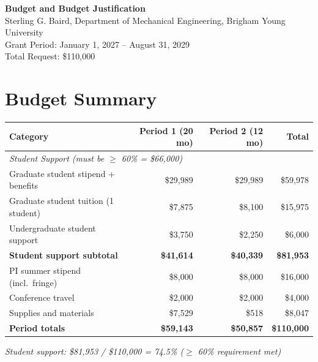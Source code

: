 \documentclass[12pt]{article}
\begin{document}
\begin{center}
{\Large \textbf{Budget and Budget Justification}}\\[0.5em]
{\normalsize Sterling G. Baird, Department of Mechanical Engineering, Brigham Young University}\\[0.3em]
{\normalsize Grant Period: January 1, 2027 -- August 31, 2029}\\[0.3em]
{\normalsize Total Request: \$110,000}
\end{center}

\bigskip

\section*{Budget Summary}

\begin{center}
\begin{tabular}{l r r r}
\toprule
\textbf{Category} & \textbf{Period 1 (20 mo)} & \textbf{Period 2 (12 mo)} & \textbf{Total} \\
\midrule
\multicolumn{4}{l}{\textit{Student Support (must be $\geq$ 60\% = \$66,000)}} \\
\quad Graduate student stipend + benefits & \$29,989 & \$29,989 & \$59,978 \\
\quad Graduate student tuition (1 student) & \$7,875  & \$8,100  & \$15,975 \\
\quad Undergraduate student support       & \$3,750  & \$2,250  & \$6,000 \\
\textbf{Student support subtotal}         & \textbf{\$41,614} & \textbf{\$40,339} & \textbf{\$81,953} \\
\midrule
PI summer stipend (incl.\ fringe)         & \$8,000  & \$8,000  & \$16,000 \\
Conference travel                         & \$2,000  & \$2,000  & \$4,000 \\
Supplies and materials                    & \$7,529  & \$518    & \$8,047 \\
\midrule
\textbf{Period totals}                     & \textbf{\$59,143} & \textbf{\$50,857} & \textbf{\$110,000} \\
\bottomrule
\end{tabular}
\end{center}

\bigskip

\noindent\textit{Student support: \$81,953 / \$110,000 = 74.5\% ($\geq$ 60\% requirement met)}

\bigskip
\end{document}
